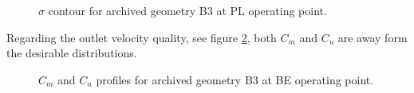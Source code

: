 \begin{figure}[h!]
\begin{minipage}[b]{1\linewidth}
 \centering
\end{minipage}
\caption{$\sigma$ contour for archived geometry B3 at PL operating point.}
\label{Francis-B3-PL}
\end{figure}

Regarding the outlet velocity quality, see figure \ref{Francis-B3-OUT}, both $C_m$  and $C_u$ are away form the desirable distributions.   

\begin{figure}[h!]
\begin{minipage}[b]{1\linewidth}
 \centering
\end{minipage}
\caption{$C_m$ and $C_u$ profiles for archived geometry B3 at BE operating point.}
\label{Francis-B3-OUT}
\end{figure}

